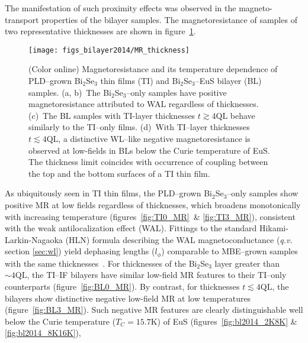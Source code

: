 The manifestation of such proximity effects was observed in the magneto-transport properties of the bilayer samples. The magnetoresistance of samples of two representative thicknesses are shown in figure~\ref{fig:bl2014_MR_thickness}.%
%
\begin{figure}[h]%
\centering%
\subfloat{\label{fig:TI0_MR}}%
\subfloat{\label{fig:TI3_MR}}%
\subfloat{\label{fig:BL0_MR}}%
\subfloat{\label{fig:BL3_MR}}%
\texttt{[image: figs\_bilayer2014/MR\_thickness]}%
\caption[Magnetoresistance of various Bi$_2$Se$_3$ thin films and Bi$_2$Se$_3$--EuS bilayers]{\label{fig:bl2014_MR_thickness}(Color online) Magnetoresistance and its temperature dependence of PLD--grown Bi$_2$Se$_3$ thin films (TI) and Bi$_2$Se$_3$--EuS bilayer (BL) samples. (a, b)~The Bi$_2$Se$_3$--only samples have positive magnetoresistance attributed to WAL regardless of thicknesses. (c)~The BL samples with TI-layer thicknesses $t\gtrsim4\mathrm{QL}$ behave similarly to the TI--only films. (d)~With TI--layer thicknesses $t\lesssim4\mathrm{QL}$, a distinctive WL--like negative magnetoresistance is observed at low-fields in BLs below the Curie temperature of EuS. The thickness limit coincides with occurrence of coupling between the top and the bottom surfaces of a TI thin film.}%
\end{figure} %
%
As ubiquitously seen in TI thin films, the PLD--grown Bi$_2$Se$_3$--only samples show positive MR at low fields regardless of thicknesses, which broadens monotonically with increasing temperature (figures~\ref{fig:TI0_MR}~\& \ref{fig:TI3_MR}), consistent with the weak antilocalization effect (WAL). Fittings to the standard Hikami-Larkin-Nagaoka (HLN) formula describing the WAL magnetoconductance (\textit{q.v.} section \ref{sec:wl}) yield dephasing lengths ($l_\phi$) comparable to MBE--grown samples with the same thicknesses~\cite{TI_WAL_thickness, zhangli2013}. For thicknesses of the Bi$_2$Se$_3$ layer greater than $\sim4\mathrm{QL}$, the TI--IF bilayers have similar low-field MR features to their TI--only counterparts (figure~\ref{fig:BL0_MR}). By contrast, for thicknesses $t\lesssim4\mathrm{QL}$, the bilayers show distinctive negative low-field MR at low temperatures (figure~\ref{fig:BL3_MR}). Such negative MR features are clearly distinguishable well below the Curie temperature ($T_C=15.7$K) of EuS (figures~\ref{fig:bl2014_2K8K} \& \ref{fig:bl2014_8K16K}), %
%
%

